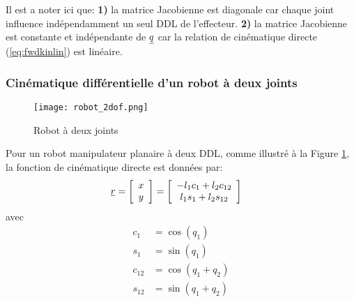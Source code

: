 Il est a noter ici que: \textbf{1)} la matrice Jacobienne est diagonale car chaque joint influence indépendamment un seul DDL de l'effecteur. \textbf{2)} la matrice Jacobienne est constante et indépendante de $\underline{q}$ car la relation de cinématique directe (\eqref{eq:fwdkinlin}) est linéaire. 


\subsubsection{Cinématique différentielle d'un robot à deux joints}

\begin{figure}[H]
	\centering
		\texttt{[image: robot\_2dof.png]}
	\caption{Robot à deux joints}
	\label{fig:robot_2dof}
\end{figure}

Pour un robot manipulateur planaire à deux DDL, comme illustré à la Figure \ref{fig:robot_2dof}, la fonction de cinématique directe est données par:
\begin{align}
\underline{r} &= \left[ \begin{array}{c} x \\ y  \end{array} \right]  = \left[ \begin{array}{c} 
-l_1 c_1 + l_2 c_{12} \\ 
 l_1 s_1 + l_2 s_{12}  
\end{array} \right] 
\label{eq:kinfwd2dof}
\end{align} 
avec
\begin{align}
c_1    &= \cos( q_1 ) \\
s_1    &= \sin( q_1 ) \\
c_{12} &= \cos( q_1 + q_2 ) \\
s_{12} &= \sin( q_1 + q_2 )
\end{align} 

